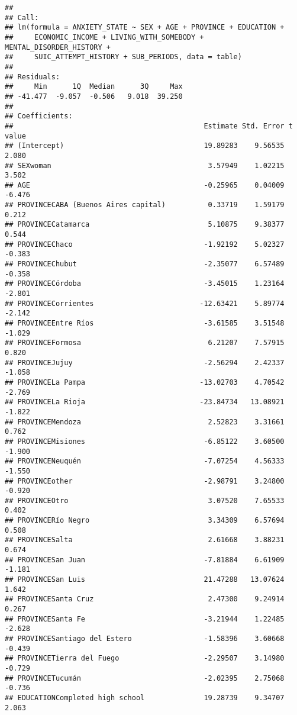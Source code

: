 \documentclass[
]{book}
\begin{document}
\begin{verbatim}
## 
## Call:
## lm(formula = ANXIETY_STATE ~ SEX + AGE + PROVINCE + EDUCATION + 
##     ECONOMIC_INCOME + LIVING_WITH_SOMEBODY + MENTAL_DISORDER_HISTORY + 
##     SUIC_ATTEMPT_HISTORY + SUB_PERIODS, data = table)
## 
## Residuals:
##     Min      1Q  Median      3Q     Max 
## -41.477  -9.057  -0.506   9.018  39.250 
## 
## Coefficients:
##                                             Estimate Std. Error t value
## (Intercept)                                 19.89283    9.56535   2.080
## SEXwoman                                     3.57949    1.02215   3.502
## AGE                                         -0.25965    0.04009  -6.476
## PROVINCECABA (Buenos Aires capital)          0.33719    1.59179   0.212
## PROVINCECatamarca                            5.10875    9.38377   0.544
## PROVINCEChaco                               -1.92192    5.02327  -0.383
## PROVINCEChubut                              -2.35077    6.57489  -0.358
## PROVINCECórdoba                             -3.45015    1.23164  -2.801
## PROVINCECorrientes                         -12.63421    5.89774  -2.142
## PROVINCEEntre Ríos                          -3.61585    3.51548  -1.029
## PROVINCEFormosa                              6.21207    7.57915   0.820
## PROVINCEJujuy                               -2.56294    2.42337  -1.058
## PROVINCELa Pampa                           -13.02703    4.70542  -2.769
## PROVINCELa Rioja                           -23.84734   13.08921  -1.822
## PROVINCEMendoza                              2.52823    3.31661   0.762
## PROVINCEMisiones                            -6.85122    3.60500  -1.900
## PROVINCENeuquén                             -7.07254    4.56333  -1.550
## PROVINCEother                               -2.98791    3.24800  -0.920
## PROVINCEOtro                                 3.07520    7.65533   0.402
## PROVINCERío Negro                            3.34309    6.57694   0.508
## PROVINCESalta                                2.61668    3.88231   0.674
## PROVINCESan Juan                            -7.81884    6.61909  -1.181
## PROVINCESan Luis                            21.47288   13.07624   1.642
## PROVINCESanta Cruz                           2.47300    9.24914   0.267
## PROVINCESanta Fe                            -3.21944    1.22485  -2.628
## PROVINCESantiago del Estero                 -1.58396    3.60668  -0.439
## PROVINCETierra del Fuego                    -2.29507    3.14980  -0.729
## PROVINCETucumán                             -2.02395    2.75068  -0.736
## EDUCATIONCompleted high school              19.28739    9.34707   2.063

\end{verbatim}
\end{document}

